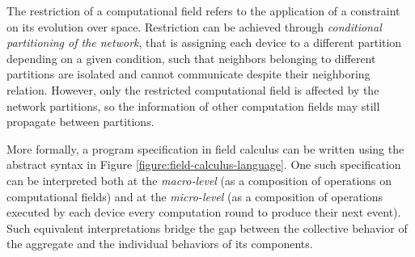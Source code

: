 The restriction of a computational field refers to the application of a
constraint on its evolution over space. Restriction can be achieved through
\textit{conditional partitioning of the network}, that is assigning each device
to a different partition depending on a given condition, such that neighbors
belonging to different partitions are isolated and cannot communicate despite
their neighboring relation. However, only the restricted computational field is
affected by the network partitions, so the information of other computation
fields may still propagate between partitions.

More formally, a program specification in field calculus can be written using
the abstract syntax in Figure \ref{figure:field-calculus-language}. One such
specification can be interpreted both at the \textit{macro-level} (as a
composition of operations on computational fields) and at the
\textit{micro-level} (as a composition of operations executed by each device
every computation round to produce their next event). Such equivalent
interpretations bridge the gap between the collective behavior of the aggregate
and the individual behaviors of its components.


